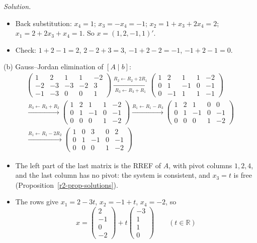 \documentclass[12pt]{article}
\newcommand{\R}{\mathbb R}
\theoremstyle{definition}
\newenvironment{solution}{\par\noindent\textit{Solution.}\ }{\par\smallskip}
\begin{document}
\begin{solution}
\begin{itemize}
\item Back substitution: \(x_4=1\); \(x_3=-x_4=-1\); \(x_2=1+x_3+2x_4=2\); \(x_1=2+2x_3+x_4=1\).
So \(x=(1,2,-1,1)'\).
\item Check: \(1+2-1=2\), \(2-2+3=3\), \(-1+2-2=-1\), \(-1+2-1=0\).
\end{itemize}
(b) Gauss--Jordan elimination of \([A\mid b]\):
\[
\begin{gathered}
\left(\begin{array}{cccc|c}1&2&1&1&-2\\-2&-3&-3&-2&3\\-1&-3&0&0&1\end{array}\right)
\xrightarrow[R_3\leftarrow R_3+R_1]{R_2\leftarrow R_2+2R_1}
\left(\begin{array}{cccc|c}1&2&1&1&-2\\0&1&-1&0&-1\\0&-1&1&1&-1\end{array}\right)
\\
\xrightarrow{R_3\leftarrow R_3+R_2}
\left(\begin{array}{cccc|c}1&2&1&1&-2\\0&1&-1&0&-1\\0&0&0&1&-2\end{array}\right)
\xrightarrow{R_1\leftarrow R_1-R_3}
\left(\begin{array}{cccc|c}1&2&1&0&0\\0&1&-1&0&-1\\0&0&0&1&-2\end{array}\right)
\\
\xrightarrow{R_1\leftarrow R_1-2R_2}
\left(\begin{array}{cccc|c}1&0&3&0&2\\0&1&-1&0&-1\\0&0&0&1&-2\end{array}\right)
\end{gathered}
\]
\begin{itemize}
\item The left part of the last matrix is the RREF of \(A\), with pivot columns \(1,2,4\), and the last column has
no pivot: the system is consistent, and \(x_3=t\) is free (Proposition~\ref{r2-prop-solutions}).
\item The rows give \(x_1=2-3t\), \(x_2=-1+t\), \(x_4=-2\), so
\[
x=\begin{pmatrix}2\\-1\\0\\-2\end{pmatrix}+t\begin{pmatrix}-3\\1\\1\\0\end{pmatrix}\qquad(t\in\R)
\]
\end{itemize}
\end{solution}
\end{document}
